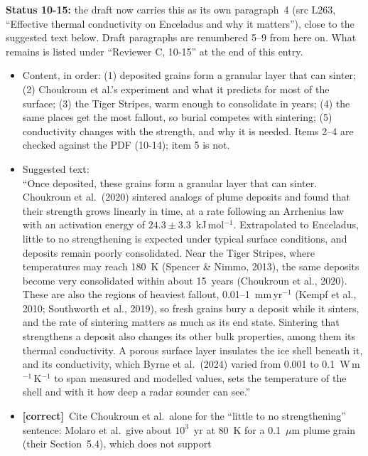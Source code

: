 \documentclass[11pt]{article}
\newcommand{\tC}{\textcolor{miss}{\textbf{[correct]}}\ }
\newcommand{\add}[1]{\textcolor{revX}{#1}}
\begin{document}
\begin{enumerate}
  \add{\textbf{Status 10-15:} the draft now carries this as its own
  paragraph~4 (src L263, ``Effective thermal conductivity on Enceladus and
  why it matters''), close to the suggested text below. Draft paragraphs
  are renumbered 5--9 from here on. What remains is listed under ``Reviewer C,
  10-15'' at the end of this entry.}
  \begin{itemize}
  \item Content, in order: (1) deposited grains form a granular layer that
    can sinter; (2) Choukroun et al.'s experiment and what it predicts for
    most of the surface; (3) the Tiger Stripes, warm enough to consolidate
    in years; (4) the same places get the most fallout, so burial competes
    with sintering; (5) conductivity changes with the strength, and why it
    is needed. Items 2--4 are checked against the PDF (10-14); item 5 is
    not.
  \item Suggested text:\\
    ``Once deposited, these grains form a granular layer that can sinter.
    Choukroun et al.\ (2020) sintered analogs of plume deposits and found
    that their strength grows linearly in time, at a rate following an
    Arrhenius law with an activation energy of $24.3 \pm 3.3$~kJ\,mol$^{-1}$.
    Extrapolated to Enceladus, little to no strengthening is expected under
    typical surface conditions, and deposits remain poorly consolidated.
    Near the Tiger Stripes, where temperatures may reach 180~K (Spencer \&
    Nimmo, 2013), the same deposits become very consolidated within about
    15~years (Choukroun et al., 2020). These are also the regions of
    heaviest fallout, 0.01--1~mm\,yr$^{-1}$ (Kempf et al., 2010; Southworth
    et al., 2019), so fresh grains bury a deposit while it sinters, and the
    rate of sintering matters as much as its end state. Sintering that
    strengthens a deposit also changes its other bulk properties, among
    them its thermal conductivity. A porous surface layer insulates the ice
    shell beneath it, and its conductivity, which Byrne et al.\ (2024)
    varied from 0.001 to 0.1~W\,m$^{-1}$\,K$^{-1}$ to span measured and
    modelled values, sets the temperature of the shell and with it how deep
    a radar sounder can see.''
  \item \tC Cite Choukroun et al.\ alone for the ``little to no
    strengthening'' sentence: Molaro et al.\ give about $10^3$~yr at 80~K
    for a 0.1~$\mu$m plume grain (their Section~5.4), which does not support

\end{itemize}
\end{enumerate}
\end{document}
